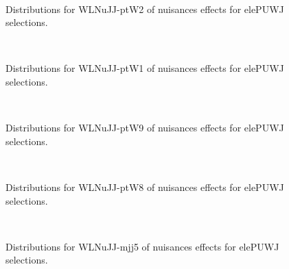 \begin{figure}[htbp]  
\centering 
\\ 
\caption{ 
   Distributions for WLNuJJ-ptW2 of nuisances effects for elePUWJ selections.
} 
\label{fig:WLNuJJ_ptW2_elePUWJ} 
\end{figure} 




\begin{figure}[htbp]  
\centering 
\\ 
\caption{ 
   Distributions for WLNuJJ-ptW1 of nuisances effects for elePUWJ selections.
} 
\label{fig:WLNuJJ_ptW1_elePUWJ} 
\end{figure} 




\begin{figure}[htbp]  
\centering 
\\ 
\caption{ 
   Distributions for WLNuJJ-ptW9 of nuisances effects for elePUWJ selections.
} 
\label{fig:WLNuJJ_ptW9_elePUWJ} 
\end{figure} 




\begin{figure}[htbp]  
\centering 
\\ 
\caption{ 
   Distributions for WLNuJJ-ptW8 of nuisances effects for elePUWJ selections.
} 
\label{fig:WLNuJJ_ptW8_elePUWJ} 
\end{figure} 




\begin{figure}[htbp]  
\centering 
\\ 
\caption{ 
   Distributions for WLNuJJ-mjj5 of nuisances effects for elePUWJ selections.
} 
\label{fig:WLNuJJ_mjj5_elePUWJ} 
\end{figure} 




